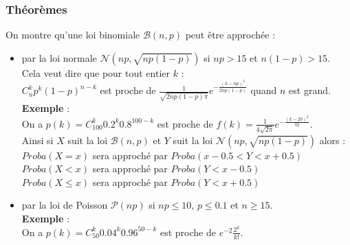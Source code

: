 \documentclass[a4paper,11pt]{book}
\begin{document}
\subsubsection{Th\'eor\`emes}
On montre qu'une loi binomiale $\mathcal B(n,p)$ peut \^etre approch\'ee :\\
\begin{itemize}
\item par la loi normale $\mathcal N(np,\sqrt{np(1-p)})$ si $np>15$ et $n(1-p)>15$.\\
Cela veut dire que pour tout entier $k$ :\\
$C_n^kp^k(1-p)^{n-k}$ est proche de  
$\frac{1}{\sqrt{2np(1-p)\pi}}e^{-\frac {(k-np)^2}{2np(1-p)}}$ quand $n$ est 
grand.\\
{\bf Exemple} :\\
On a  $p(k)=C_{100}^k0.2^k0.8^{100-k}$ est proche de 
$f(k)=\frac{1}{4\sqrt{2\pi}}e^{-\frac {(k-20)^2}{32}}$.\\
Ainsi si $X$ suit la loi $\mathcal B(n,p)$ et $Y$ suit la loi 
$\mathcal N(np,\sqrt{np(1-p)})$ alors :\\
$Proba(X=x)$ sera approch\'e par $Proba(x-0.5<Y<x+0.5)$\\
$Proba(X<x)$ sera approch\'e par $Proba(Y<x-0.5)$\\
$Proba(X\leq x)$ sera approch\'e par $Proba(Y<x+0.5)$\\

\item  par la loi de Poisson 
$\mathcal P(np)$ si $np \leq 10$, $p\leq 0.1$ et  $n \geq 15$.\\
{\bf Exemple} :\\
On a $p(k)=C_{50}^k0.04^k0.96^{50-k}$ est proche de $e^{-2}\frac{2^k}{k!}$.
\end{itemize}
\end{document}
